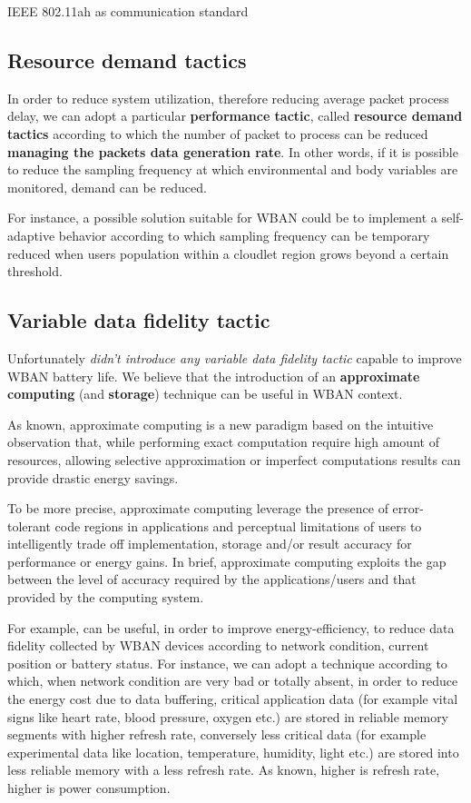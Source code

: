 \documentclass[10pt]{beamer}
\begin{document}
\begin{frame}{IEEE 802.11ah as communication standard}
\begin{itemize}
\end{itemize}

\subsection{Resource demand tactics}

In order to reduce system utilization, therefore reducing average packet process delay, we can adopt a particular \textbf{performance tactic}, called \textbf{resource demand tactics} according to which the number of packet to process can be reduced \textbf{managing the packets data generation rate}. In other words, if it is possible to reduce the sampling frequency at which environmental and body variables are monitored, demand can be reduced.\cite{BassSoftwareArchitecture2003} 

For instance, a possible solution suitable for WBAN could be to implement a self-adaptive behavior according to which sampling frequency can be temporary reduced when users population within a cloudlet region grows beyond a certain threshold.


\subsection{Variable data fidelity tactic}

Unfortunately \citet{MSAReport} \textit{didn't introduce any variable data fidelity tactic} capable to improve WBAN battery life. We believe that the introduction of an \textbf{approximate computing} (and \textbf{storage}) technique can be useful in WBAN context. 

As known, approximate computing is a new paradigm based on the intuitive observation that, while performing exact computation require high amount of resources, allowing selective approximation or imperfect computations results can provide drastic energy savings.

To be more precise, approximate computing leverage the presence of error-tolerant code regions in applications and perceptual limitations of users to intelligently trade off implementation, storage and/or result accuracy for performance or energy gains. In brief, approximate computing exploits the gap between the level of accuracy required by the applications/users and that provided by the computing system.

For example, can be useful, in order to improve energy-efficiency, to reduce data fidelity collected by WBAN devices according to network condition, current position or battery status. For instance, we can adopt a technique according to which, when network condition are very bad or totally absent, in order to reduce the energy cost due to data buffering, critical application data (for example vital signs like heart rate, blood pressure, oxygen etc.) are stored in reliable memory segments with higher refresh rate, conversely less critical data (for example experimental data like location, temperature, humidity, light etc.) are stored into less reliable memory with a less refresh rate. As known, higher is refresh rate, higher is power consumption.\cite{Towards}


\end{frame}
\end{document}
